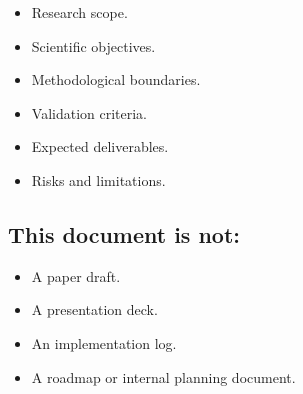 \begin{itemize}
  \item Research scope.
  \item Scientific objectives.
  \item Methodological boundaries.
  \item Validation criteria.
  \item Expected deliverables.
  \item Risks and limitations.
\end{itemize}

\subsection*{This document is not:}

\begin{itemize}
  \item A paper draft.
  \item A presentation deck.
  \item An implementation log.
  \item A roadmap or internal planning document.
\end{itemize}

\clearpage

